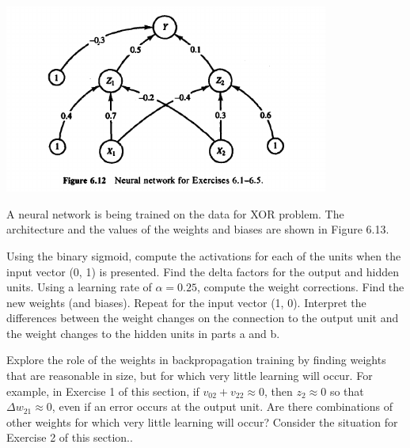 \begin{center}
\includegraphics[width=0.8\textwidth]{img/figure6-12.png}
\end{center}

\begin{problem}[6]
A neural network is being trained on the data for XOR problem. The architecture and the values of the weights and biases are shown in Figure 6.13.

\ppart Using the binary sigmoid, compute the activations for each of the units when the input vector (0, 1) is presented. Find the delta factors for the output and hidden units. Using a learning rate of $α = 0.25$, compute the weight corrections. Find the new weights (and biases).
\ppart Repeat for the input vector (1, 0).
\ppart Interpret the differences between the weight changes on the connection to the output unit and the weight changes to the hidden units in parts a and b.
\solution
\end{problem}

\begin{problem}[7]
Explore the role of the weights in backpropagation training by finding weights that are reasonable in size, but for which very little learning will occur. For example, in Exercise 1 of this section, if $v_{02}+v_{22}\approx 0$, then $z_2 \approx 0$ so that $Δw_{21}\approx 0$, even if an error occurs at the output unit. Are there combinations of other weights for which very little
learning will occur? Consider the situation for Exercise 2 of this section..

\solution
\end{problem}